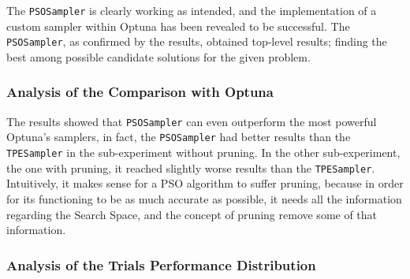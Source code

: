 The \texttt{PSOSampler} is clearly working as intended, and the implementation of a custom sampler within Optuna has been revealed to be successful.
The \texttt{PSOSampler}, as confirmed by the results, obtained top-level results; finding the best among possible candidate solutions for the given problem.

\subsubsection{Analysis of the Comparison with Optuna}

The results showed that \texttt{PSOSampler} can even outperform the most powerful Optuna's samplers, in fact, the \texttt{PSOSampler} had better results than the \texttt{TPESampler} in the sub-experiment without pruning.
In the other sub-experiment, the one with pruning, it reached slightly worse results than the \texttt{TPESampler}. Intuitively, it makes sense for a PSO algorithm to suffer pruning, because in order for its functioning to be as much accurate as possible, it needs all the information regarding the Search Space, and the concept of pruning remove some of that information.

\subsubsection{Analysis of the Trials Performance Distribution}

